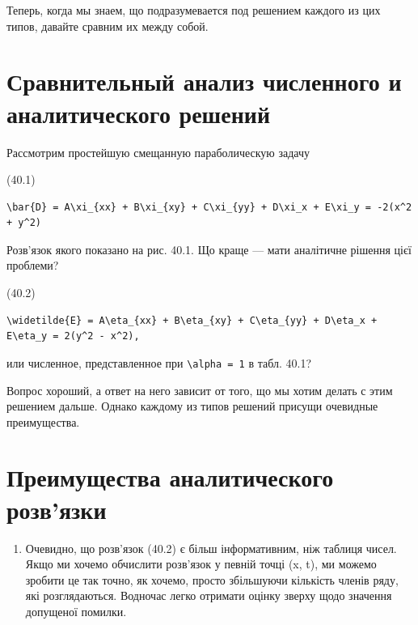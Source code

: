 \documentclass[
  ukrainian,
]{article}
\providecommand{\tightlist}{%
  \setlength{\itemsep}{0pt}\setlength{\parskip}{0pt}}
\begin{document}
Теперь, когда мы знаем, що подразумевается под решением каждого из цих
типов, давайте сравним их между собой.

\section{\texorpdfstring{\textbf{Сравнительный анализ численного} и
аналитического
решений}{Сравнительный анализ численного и аналитического решений}}\label{ux441ux440ux430ux432ux43dux438ux442ux435ux43bux44cux43dux44bux439-ux430ux43dux430ux43bux438ux437-ux447ux438ux441ux43bux435ux43dux43dux43eux433ux43e-ux438-ux430ux43dux430ux43bux438ux442ux438ux447ux435ux441ux43aux43eux433ux43e-ux440ux435ux448ux435ux43dux438ux439}

Рассмотрим простейшую смещанную параболическую задачу

(40.1)

\begin{verbatim}
\bar{D} = A\xi_{xx} + B\xi_{xy} + C\xi_{yy} + D\xi_x + E\xi_y = -2(x^2 + y^2)
\end{verbatim}

Розв'язок якого показано на рис. 40.1. Що краще --- мати аналітичне
рішення цієї проблеми?

(40.2)

\begin{verbatim}
\widetilde{E} = A\eta_{xx} + B\eta_{xy} + C\eta_{yy} + D\eta_x + E\eta_y = 2(y^2 - x^2),
\end{verbatim}

или численное, представленное при \texttt{\textbackslash{}alpha\ =\ 1} в
табл. 40.1?

Вопрос хороший, а ответ на него зависит от того, що мы хотим делать с
этим решением дальше. Однако каждому из типов решений присущи очевидные
преимущества.

\section{Преимущества аналитического
розв'язки}\label{ux43fux440ux435ux438ux43cux443ux449ux435ux441ux442ux432ux430-ux430ux43dux430ux43bux438ux442ux438ux447ux435ux441ux43aux43eux433ux43e-ux440ux43eux437ux432ux44fux437ux43aux438}

\begin{enumerate}
\def\labelenumi{\arabic{enumi}.}
\tightlist
\item
  Очевидно, що розв'язок (40.2) є більш інформативним, ніж таблиця
  чисел. Якщо ми хочемо обчислити розв'язок у певній точці (x, t), ми
  можемо зробити це так точно, як хочемо, просто збільшуючи кількість
  членів ряду, які розглядаються. Водночас легко отримати оцінку зверху
  щодо значення допущеної помилки.
\end{enumerate}
\end{document}
